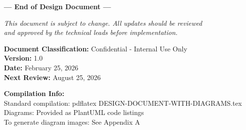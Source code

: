 \documentclass[12pt,a4paper]{report}
\begin{document}
\begin{center}
\Large\textbf{--- End of Design Document ---}

\vspace{1cm}

\textit{This document is subject to change. All updates should be reviewed \\
and approved by the technical leads before implementation.}

\vspace{1cm}

\small
\textbf{Document Classification:} Confidential - Internal Use Only\\
\textbf{Version:} 1.0\\
\textbf{Date:} February 25, 2026\\
\textbf{Next Review:} August 25, 2026

\vspace{1cm}

\textbf{Compilation Info:}\\
Standard compilation: pdflatex DESIGN-DOCUMENT-WITH-DIAGRAMS.tex\\
Diagrams: Provided as PlantUML code listings\\
To generate diagram images: See Appendix A
\end{center}
\end{document}
